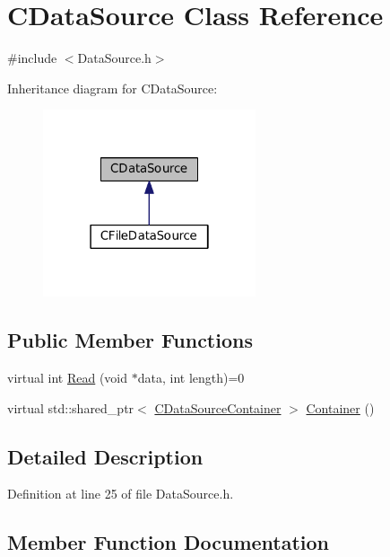 \hypertarget{classCDataSource}{}\section{C\+Data\+Source Class Reference}
\label{classCDataSource}


{\ttfamily \#include $<$Data\+Source.\+h$>$}



Inheritance diagram for C\+Data\+Source\+:\nopagebreak
\begin{figure}[H]
\begin{center}
\leavevmode
\includegraphics[width=178pt]{classCDataSource__inherit__graph}
\end{center}
\end{figure}
\subsection*{Public Member Functions}
\begin{DoxyCompactItemize}
\item 
virtual int \hyperlink{classCDataSource_ad94adc5076f973dcce83b73395eec86b}{Read} (void $\ast$data, int length)=0
\item 
virtual std\+::shared\+\_\+ptr$<$ \hyperlink{classCDataSourceContainer}{C\+Data\+Source\+Container} $>$ \hyperlink{classCDataSource_ada14cfe01c850d01b23c9b49d2f65efc}{Container} ()
\end{DoxyCompactItemize}


\subsection{Detailed Description}


Definition at line 25 of file Data\+Source.\+h.



\subsection{Member Function Documentation}
\hypertarget{classCDataSource_ada14cfe01c850d01b23c9b49d2f65efc}{}\label{classCDataSource_ada14cfe01c850d01b23c9b49d2f65efc} 
